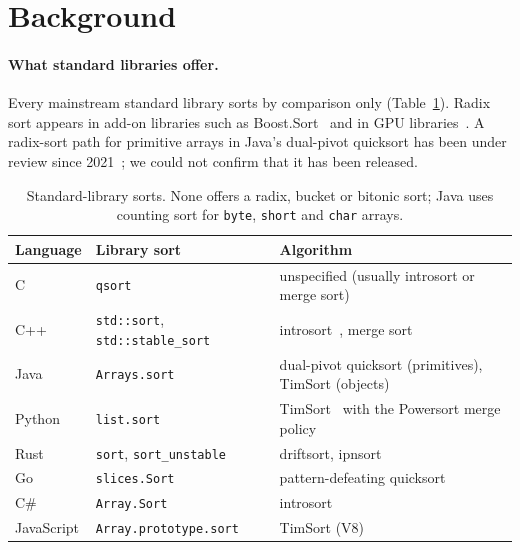 \documentclass[11pt]{article}
\theoremstyle{definition}
\begin{document}
\section{Background}\label{sec:background}

\paragraph{What standard libraries offer.} Every mainstream standard library
sorts by comparison only (Table~\ref{tab:stdlib}). Radix sort appears in
add-on libraries such as Boost.Sort~\cite{boostsort} and in GPU
libraries~\cite{satish2009gpu,merrill2011radix}. A radix-sort path for
primitive arrays in Java's dual-pivot quicksort has been under review since
2021~\cite{jdk8266431}; we could not confirm that it has been released.

\begin{table}[t]
\centering
\small
\begin{tabular}{lll}
\toprule
Language & Library sort & Algorithm \\
\midrule
C & \texttt{qsort} & unspecified (usually introsort or merge sort) \\
C++ & \texttt{std::sort}, \texttt{std::stable\_sort} & introsort~\cite{musser1997introsort}, merge sort \\
Java & \texttt{Arrays.sort} & dual-pivot quicksort (primitives), TimSort (objects)~\cite{javaarrays} \\
Python & \texttt{list.sort} & TimSort~\cite{peters2002listsort} with the Powersort merge policy~\cite{munro2018powersort} \\
Rust & \texttt{sort}, \texttt{sort\_unstable} & driftsort, ipnsort~\cite{driftsort} \\
Go & \texttt{slices.Sort} & pattern-defeating quicksort~\cite{go119,peters2021pdqsort} \\
C\# & \texttt{Array.Sort} & introsort~\cite{dotnetsort} \\
JavaScript & \texttt{Array.prototype.sort} & TimSort (V8)~\cite{v8sort} \\
\bottomrule
\end{tabular}
\caption{Standard-library sorts. None offers a radix, bucket or bitonic sort;
Java uses counting sort for \texttt{byte}, \texttt{short} and \texttt{char} arrays.}
\label{tab:stdlib}
\end{table}
\end{document}

